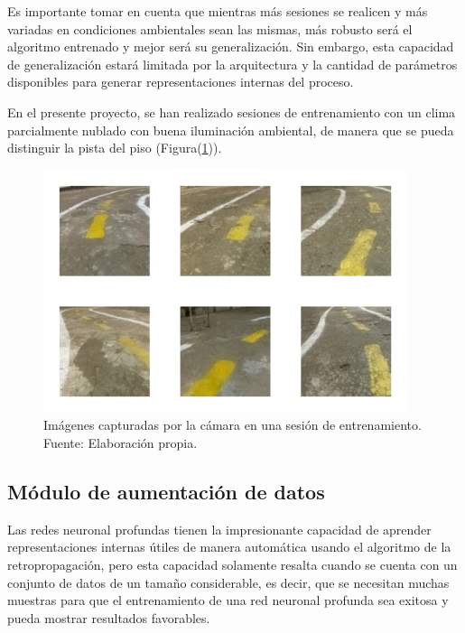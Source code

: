         Es importante tomar en cuenta que mientras más sesiones se realicen y más variadas en condiciones ambientales sean las mismas, 
        más robusto será el algoritmo entrenado y mejor será su generalización. Sin embargo, esta capacidad de generalización estará 
        limitada por la arquitectura y la cantidad de parámetros disponibles para generar representaciones internas del proceso. 

        En el presente proyecto, se han realizado sesiones de entrenamiento con un clima parcialmente nublado con buena iluminación 
        ambiental, de manera que se pueda distinguir la pista del piso (Figura(\ref{fig:fotosejemplo})).

        \begin{figure}[!h] 
            \centering
            \includegraphics[width=0.95\textwidth]{img/fotosejemplo}
            \caption[Imágenes capturadas por la cámara en una sesión de entrenamiento]{Imágenes capturadas por la cámara en una sesión de entrenamiento. Fuente: Elaboración propia. }
            \label{fig:fotosejemplo}
        \end{figure}

    \subsection{Módulo de aumentación de datos}
    Las redes neuronal profundas tienen la impresionante capacidad de aprender representaciones internas útiles de manera automática 
    usando el algoritmo de la retropropagación, pero esta capacidad solamente resalta cuando se cuenta con un conjunto de datos 
    de un tamaño considerable, es decir, que se necesitan muchas muestras para que el entrenamiento de una red neuronal profunda 
    sea exitosa y pueda mostrar resultados favorables. 
    
